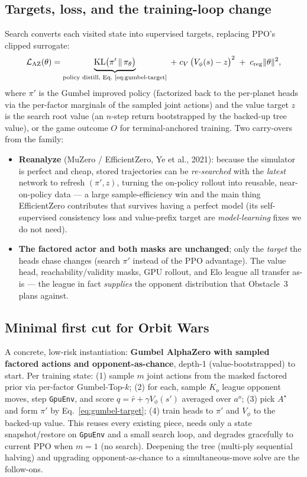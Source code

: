 \documentclass[11pt]{article}
\newcommand{\pol}{\pi_\theta}
\begin{document}
\subsection{Targets, loss, and the training-loop change}
Search converts each visited state into supervised targets, replacing PPO's clipped surrogate:
\begin{equation}
\mathcal L_{\mathrm{AZ}}(\theta) = \underbrace{\mathrm{KL}\big(\pi'\,\|\,\pol\big)}_{\text{policy distill, Eq.~\eqref{eq:gumbel-target}}}
\;+\; c_V\,\big(V_\phi(s)-z\big)^2 \;+\; c_{\mathrm{reg}}\lVert\theta\rVert^2,
\end{equation}
where $\pi'$ is the Gumbel improved policy (factorized back to the per-planet heads via the per-factor
marginals of the sampled joint actions) and the value target $z$ is the search root value (an $n$-step
return bootstrapped by the backed-up tree value), or the game outcome $O$ for terminal-anchored
training. Two carry-overs from the family:
\begin{itemize}[nosep]
\item \textbf{Reanalyze} (MuZero / EfficientZero, Ye et al., 2021): because the simulator is perfect and
cheap, stored trajectories can be \emph{re-searched} with the \emph{latest} network to refresh
$(\pi',z)$, turning the on-policy rollout into reusable, near-on-policy data --- a large sample-efficiency
win and the main thing EfficientZero contributes that survives having a perfect model (its
self-supervised consistency loss and value-prefix target are \emph{model-learning} fixes we do not need).
\item \textbf{The factored actor and both masks are unchanged}; only the \emph{target} the heads chase
changes (search $\pi'$ instead of the PPO advantage). The value head, reachability/validity masks, GPU
rollout, and Elo league all transfer as-is --- the league in fact \emph{supplies} the opponent
distribution that Obstacle~3 plans against.
\end{itemize}

\subsection{Minimal first cut for Orbit Wars}
A concrete, low-risk instantiation: \textbf{Gumbel AlphaZero with sampled factored actions and
opponent-as-chance}, depth-1 (value-bootstrapped) to start. Per training state: (1) sample $m$ joint
actions from the masked factored prior via per-factor Gumbel-Top-$k$; (2) for each, sample $K_o$ league
opponent moves, step \texttt{GpuEnv}, and score $q=\bar r + \gamma V_\phi(s')$ averaged over $a^o$;
(3) pick $A^\star$ and form $\pi'$ by Eq.~\eqref{eq:gumbel-target}; (4) train heads to $\pi'$ and
$V_\phi$ to the backed-up value. This reuses every existing piece, needs only a state
snapshot/restore on \texttt{GpuEnv} and a small search loop, and degrades gracefully to current PPO
when $m{=}1$ (no search). Deepening the tree (multi-ply sequential halving) and upgrading
opponent-as-chance to a simultaneous-move solve are the follow-ons.
\end{document}
